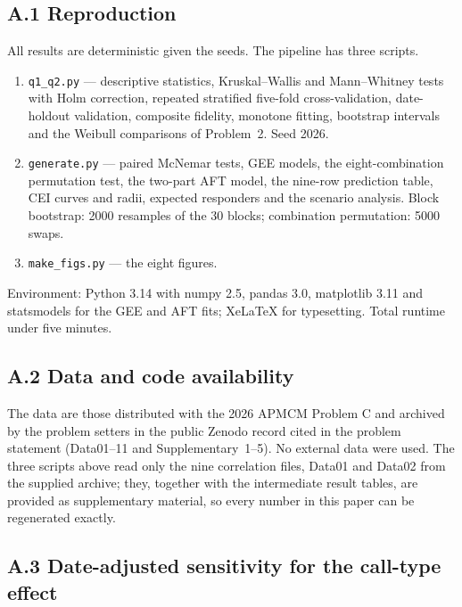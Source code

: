 \subsection*{A.1 Reproduction}

All results are deterministic given the seeds. The pipeline has three scripts.

\begin{enumerate}[leftmargin=1.8em,itemsep=2pt]
  \item \texttt{q1\_q2.py} --- descriptive statistics, Kruskal--Wallis and Mann--Whitney tests
        with Holm correction, repeated stratified five-fold cross-validation, date-holdout
        validation, composite fidelity, monotone fitting, bootstrap intervals and the Weibull
        comparisons of Problem~2. Seed 2026.
  \item \texttt{generate.py} --- paired McNemar tests, GEE models, the eight-combination
        permutation test, the two-part AFT model, the nine-row prediction table, CEI curves and
        radii, expected responders and the scenario analysis. Block bootstrap: 2000 resamples of
        the 30 blocks; combination permutation: 5000 swaps.
  \item \texttt{make\_figs.py} --- the eight figures.
\end{enumerate}

Environment: Python 3.14 with numpy 2.5, pandas 3.0, matplotlib 3.11 and statsmodels for the GEE
and AFT fits; XeLaTeX for typesetting. Total runtime under five minutes.

\subsection*{A.2 Data and code availability}

The data are those distributed with the 2026 APMCM Problem C and archived by the problem setters
in the public Zenodo record cited in the problem statement (Data01--11 and Supplementary~1--5).
No external data were used. The three scripts above read only the nine correlation files, Data01
and Data02 from the supplied archive; they, together with the intermediate result tables, are
provided as supplementary material, so every number in this paper can be regenerated exactly.


\subsection*{A.3 Date-adjusted sensitivity for the call-type effect}

